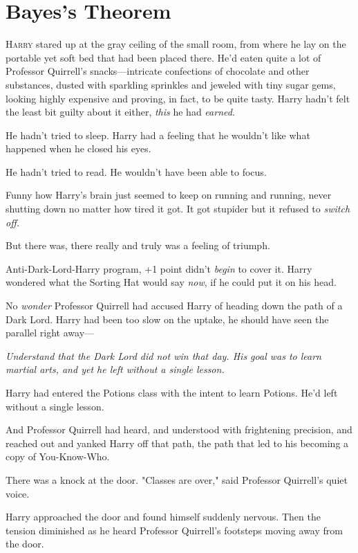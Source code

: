 \chapter{Bayes's Theorem}

\lettrine{H}{arry} stared up at the gray ceiling of the small room, from where he lay on the
portable yet soft bed that had been placed there. He'd eaten quite a lot of
Professor Quirrell's snacks---intricate confections of chocolate and other
substances, dusted with sparkling sprinkles and jeweled with tiny sugar gems,
looking highly expensive and proving, in fact, to be quite tasty. Harry hadn't
felt the least bit guilty about it either, \emph{this} he had \emph{earned}.

He hadn't tried to sleep. Harry had a feeling that he wouldn't like what
happened when he closed his eyes.

He hadn't tried to read. He wouldn't have been able to focus.

Funny how Harry's brain just seemed to keep on running and running, never
shutting down no matter how tired it got. It got stupider but it refused to
\emph{switch off.}

But there was, there really and truly was a feeling of triumph.

Anti-Dark-Lord-Harry program, +1 point didn't \emph{begin} to cover it. Harry
wondered what the Sorting Hat would say \emph{now}, if he could put it on his
head.

No \emph{wonder} Professor Quirrell had accused Harry of heading down the path
of a Dark Lord. Harry had been too slow on the uptake, he should have seen the
parallel right away---

\emph{Understand that the Dark Lord did not win that day. His goal was to learn
martial arts, and yet he left without a single lesson.}

Harry had entered the Potions class with the intent to learn Potions. He'd left
without a single lesson.

And Professor Quirrell had heard, and understood with frightening precision,
and reached out and yanked Harry off that path, the path that led to his
becoming a copy of You-Know-Who.

There was a knock at the door. "Classes are over," said Professor Quirrell's
quiet voice.

Harry approached the door and found himself suddenly nervous. Then the tension
diminished as he heard Professor Quirrell's footsteps moving away from the door.

